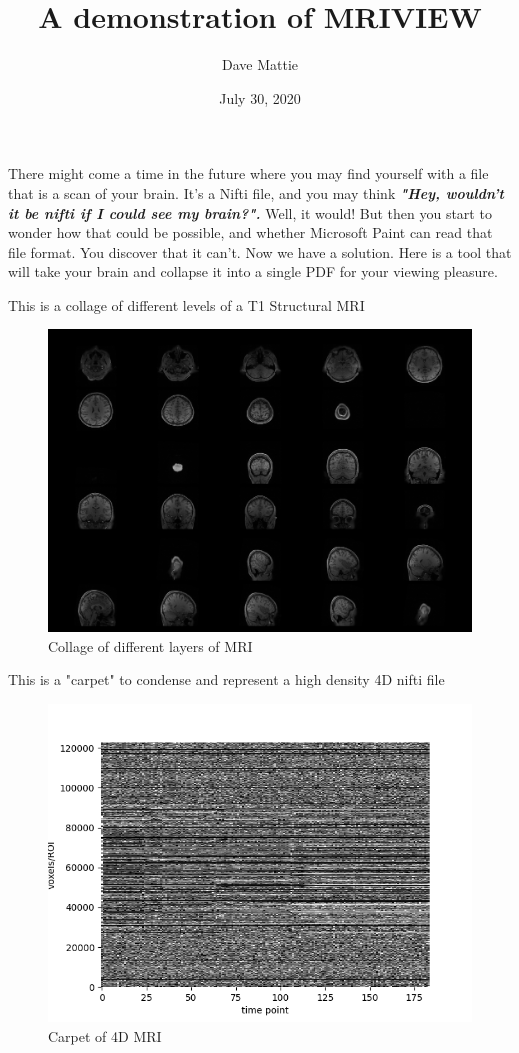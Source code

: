 \documentclass[]{report}
\begin{document}
\title{A demonstration of MRIVIEW}
\author{Dave Mattie}
\date{July 30, 2020}
\maketitle

There might come a time in the future where you may find yourself with a file 
that is a scan of your brain.  It's a Nifti file, and you may think 
\textit{\textbf{"Hey, wouldn't it be nifti if I could see my brain?".}}  Well, it would!  But then 
you start to wonder how that 
could be possible, and whether Microsoft Paint can read that file format.  You 
discover that it can't.  Now we have a solution.  Here is a tool that will take 
your brain and collapse it into a single PDF for your viewing pleasure.

This is a collage of different levels of a T1 Structural MRI

\begin{figure}[h!]
\centering
\includegraphics[scale=0.22]{collage.png}
\caption{Collage of different layers of MRI}
\label{fig:collage}
\end{figure}

This is a "carpet" to condense and represent a high density 4D nifti file

\begin{figure}[h!]
\centering
\includegraphics[scale=0.6]{carpet.png}
\caption{Carpet of 4D MRI}
\label{fig:carpet}
\end{figure}
\end{document}
